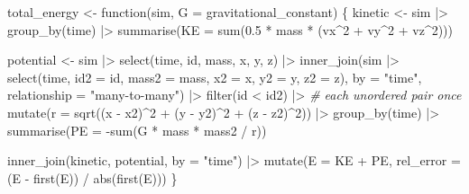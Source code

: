 \documentclass[
  10.5pt,
  letterpaper,
]{scrbook}
\newenvironment{Shaded}{\begin{snugshade}}{\end{snugshade}}
\newcommand{\AttributeTok}[1]{\textcolor[rgb]{0.00,0.00,0.00}{#1}}
\newcommand{\CommentTok}[1]{\textcolor[rgb]{0.00,0.00,0.00}{\textit{#1}}}
\newcommand{\ControlFlowTok}[1]{\textcolor[rgb]{0.00,0.00,0.00}{#1}}
\newcommand{\DecValTok}[1]{\textcolor[rgb]{0.00,0.00,0.00}{#1}}
\newcommand{\FloatTok}[1]{\textcolor[rgb]{0.00,0.00,0.00}{#1}}
\newcommand{\FunctionTok}[1]{\textcolor[rgb]{0.00,0.00,0.00}{#1}}
\newcommand{\NormalTok}[1]{\textcolor[rgb]{0.00,0.00,0.00}{#1}}
\newcommand{\OtherTok}[1]{\textcolor[rgb]{0.00,0.00,0.00}{#1}}
\newcommand{\SpecialCharTok}[1]{\textcolor[rgb]{0.00,0.00,0.00}{#1}}
\newcommand{\StringTok}[1]{\textcolor[rgb]{0.00,0.00,0.00}{#1}}
\theoremstyle{plain}
\theoremstyle{remark}
\begin{document}
\begin{Shaded}
\begin{Highlighting}[]
\NormalTok{total\_energy }\OtherTok{\textless{}{-}} \ControlFlowTok{function}\NormalTok{(sim, }\AttributeTok{G =}\NormalTok{ gravitational\_constant) \{}
\NormalTok{  kinetic }\OtherTok{\textless{}{-}}\NormalTok{ sim }\SpecialCharTok{|\textgreater{}}
    \FunctionTok{group\_by}\NormalTok{(time) }\SpecialCharTok{|\textgreater{}}
    \FunctionTok{summarise}\NormalTok{(}\AttributeTok{KE =} \FunctionTok{sum}\NormalTok{(}\FloatTok{0.5} \SpecialCharTok{*}\NormalTok{ mass }\SpecialCharTok{*}\NormalTok{ (vx}\SpecialCharTok{\^{}}\DecValTok{2} \SpecialCharTok{+}\NormalTok{ vy}\SpecialCharTok{\^{}}\DecValTok{2} \SpecialCharTok{+}\NormalTok{ vz}\SpecialCharTok{\^{}}\DecValTok{2}\NormalTok{)))}

\NormalTok{  potential }\OtherTok{\textless{}{-}}\NormalTok{ sim }\SpecialCharTok{|\textgreater{}}
    \FunctionTok{select}\NormalTok{(time, id, mass, x, y, z) }\SpecialCharTok{|\textgreater{}}
    \FunctionTok{inner\_join}\NormalTok{(sim }\SpecialCharTok{|\textgreater{}} \FunctionTok{select}\NormalTok{(time, }\AttributeTok{id2 =}\NormalTok{ id, }\AttributeTok{mass2 =}\NormalTok{ mass,}
                             \AttributeTok{x2 =}\NormalTok{ x, }\AttributeTok{y2 =}\NormalTok{ y, }\AttributeTok{z2 =}\NormalTok{ z),}
               \AttributeTok{by =} \StringTok{"time"}\NormalTok{, }\AttributeTok{relationship =} \StringTok{"many{-}to{-}many"}\NormalTok{) }\SpecialCharTok{|\textgreater{}}
    \FunctionTok{filter}\NormalTok{(id }\SpecialCharTok{\textless{}}\NormalTok{ id2) }\SpecialCharTok{|\textgreater{}}                       \CommentTok{\# each unordered pair once}
    \FunctionTok{mutate}\NormalTok{(}\AttributeTok{r =} \FunctionTok{sqrt}\NormalTok{((x }\SpecialCharTok{{-}}\NormalTok{ x2)}\SpecialCharTok{\^{}}\DecValTok{2} \SpecialCharTok{+}\NormalTok{ (y }\SpecialCharTok{{-}}\NormalTok{ y2)}\SpecialCharTok{\^{}}\DecValTok{2} \SpecialCharTok{+}\NormalTok{ (z }\SpecialCharTok{{-}}\NormalTok{ z2)}\SpecialCharTok{\^{}}\DecValTok{2}\NormalTok{)) }\SpecialCharTok{|\textgreater{}}
    \FunctionTok{group\_by}\NormalTok{(time) }\SpecialCharTok{|\textgreater{}}
    \FunctionTok{summarise}\NormalTok{(}\AttributeTok{PE =} \SpecialCharTok{{-}}\FunctionTok{sum}\NormalTok{(G }\SpecialCharTok{*}\NormalTok{ mass }\SpecialCharTok{*}\NormalTok{ mass2 }\SpecialCharTok{/}\NormalTok{ r))}

  \FunctionTok{inner\_join}\NormalTok{(kinetic, potential, }\AttributeTok{by =} \StringTok{"time"}\NormalTok{) }\SpecialCharTok{|\textgreater{}}
    \FunctionTok{mutate}\NormalTok{(}\AttributeTok{E =}\NormalTok{ KE }\SpecialCharTok{+}\NormalTok{ PE,}
           \AttributeTok{rel\_error =}\NormalTok{ (E }\SpecialCharTok{{-}} \FunctionTok{first}\NormalTok{(E)) }\SpecialCharTok{/} \FunctionTok{abs}\NormalTok{(}\FunctionTok{first}\NormalTok{(E)))}
\NormalTok{\}}
\end{Highlighting}
\end{Shaded}
\end{document}
